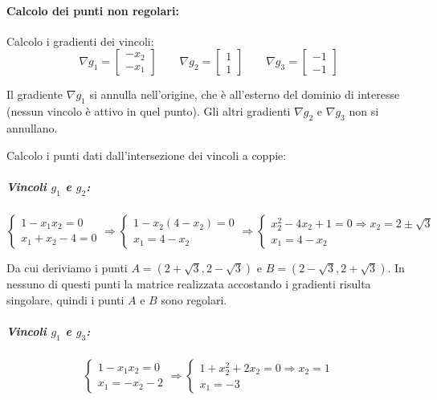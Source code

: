 \documentclass[\main/main.tex]{subfiles}
\begin{document}
\paragraph*{Calcolo dei punti non regolari:}
Calcolo i gradienti dei vincoli:
\[
  \nabla g_1 = \begin{bmatrix}
    -x_2 \\
    -x_1
  \end{bmatrix}
  \qquad
  \nabla g_2 = \begin{bmatrix}
    1 \\
    1
  \end{bmatrix}
  \qquad
  \nabla g_3 = \begin{bmatrix}
    -1 \\
    -1
  \end{bmatrix}
\]

Il gradiente $ \nabla g_1$ si annulla nell'origine, che è all'esterno del dominio di interesse (nessun vincolo è attivo in quel punto). Gli altri gradienti $ \nabla g_2$ e $\nabla g_3$ non si annullano.

Calcolo i punti dati dall'intersezione dei vincoli a coppie:

\subparagraph*{Vincoli $g_1$ e $g_2$:}

\[
  \begin{cases}
    1-x_1x_2 = 0 \\
    x_1 + x_2 - 4 = 0
  \end{cases}
  \Rightarrow
  \begin{cases}
    1-x_2(4 - x_2) = 0 \\
    x_1  = 4 - x_2
  \end{cases}
  \Rightarrow
  \begin{cases}
    x^2_2 - 4x_2 +1 = 0 \Rightarrow x_2 = 2 \pm \sqrt{3} \\
    x_1  = 4 - x_2
  \end{cases}
\]

Da cui deriviamo i punti $A = (2 + \sqrt{3}, 2 - \sqrt{3})$ e $B = (2 - \sqrt{3}, 2 + \sqrt{3})$. In nessuno di questi punti la matrice realizzata accostando i gradienti risulta singolare, quindi i punti $A$ e $B$ sono regolari.

\subparagraph*{Vincoli $g_1$ e $g_3$:}

\[
  \begin{cases}
    1-x_1x_2 = 0 \\
    x_1  = -x_2 - 2
  \end{cases}
  \Rightarrow
  \begin{cases}
    1+x^2_2 +2x_2 = 0 \Rightarrow x_2 = 1 \\
    x_1  = -3
  \end{cases}
\]
\end{document}
